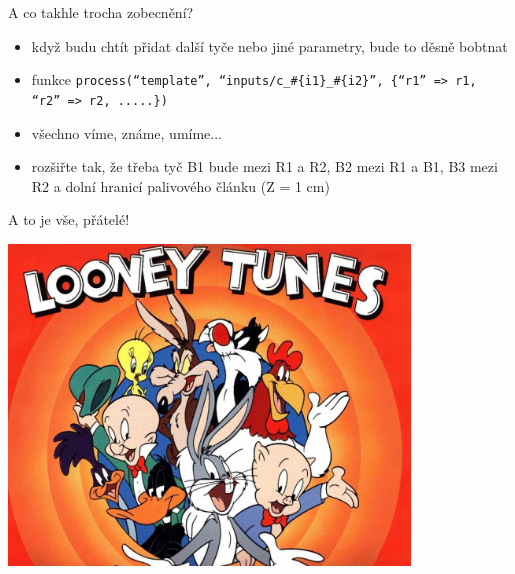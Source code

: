 \documentclass{beamer}
\begin{document}
\begin{frame}{A co takhle trocha zobecnění?}
  \begin{itemize}
    \item když budu chtít přidat další tyče nebo jiné parametry, bude to děsně bobtnat
    \item funkce \texttt{process(``template'', ``inputs/c\_\#\{i1\}\_\#\{i2\}'', \{``r1'' => r1, ``r2'' => r2, .....\})}
    \item všechno víme, známe, umíme...
    \item rozšiřte tak, že třeba tyč B1 bude mezi R1 a R2, B2 mezi R1 a B1, B3 mezi R2 a dolní hranicí palivového článku (Z = 1 cm)
  \end{itemize}
\end{frame}

\begin{frame}{A to je vše, přátelé!}
  \begin{center}
    \includegraphics[width=0.8\textwidth]{looney_tunes}
  \end{center}
\end{frame}
\end{document}
